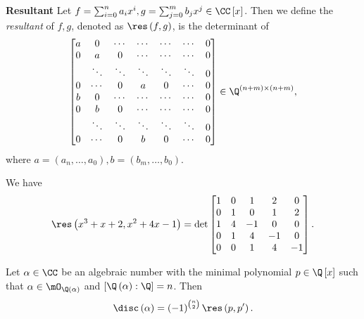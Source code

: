 \documentclass[pmath441]{subfiles}
\begin{document}
    \begin{definition}{\textbf{Resultant}}
        Let $f=\sum^{n}_{i=0}a_ix^i, g=\sum^{m}_{j=0}b_jx^j\in\CC\left[ x \right]$. Then we define the \emph{resultant} of $f,g$, denoted as $\res\left( f,g \right)$, is the determinant of
        \begin{equation*}
            \begin{bmatrix} 
                a & 0 & \cdots & \cdots & \cdots & \cdots & 0\\
                0 & a & 0 & \cdots & \cdots & \cdots & 0 \\
                  & \ddots & \ddots & \ddots & \ddots & \ddots & 0 \\
                0 & \cdots & 0 & a & 0 & \cdots & 0 \\
                b & 0 & \cdots & \cdots & \cdots & \cdots & 0  \\
                0 & b & 0 & \cdots & \cdots & \cdots & 0 \\
                  & \ddots & \ddots & \ddots & \ddots & \ddots & 0 \\
                0 & \cdots & 0 & b & 0 & \cdots & 0 \\
            \end{bmatrix} \in\Q^{\left( n+m \right)\times\left( n+m \right)} ,
        \end{equation*}
        where $a = \left( a_n,\ldots,a_0 \right), b = \left( b_m,\ldots,b_0 \right)$.
    \end{definition}

    \begin{example}{}
        We have
        \begin{equation*}
            \res\left( x^3+x+2,x^{2}+4x-1 \right) =
            \det
            \begin{bmatrix}
            	1 & 0 & 1 & 2 & 0 \\
            	0 & 1 & 0 & 1 & 2 \\
            	1 & 4 & -1 & 0 & 0 \\
            	0 & 1 & 4 & -1 & 0 \\
            	0 & 0 & 1 & 4 & -1 \\
            \end{bmatrix}.
        \end{equation*}
    \end{example}

    \rruleline
    
    \begin{fact}{}
        Let $\alpha\in\CC$ be an algebraic number with the minimal polynomial $p\in\Q\left[ x \right]$ such that $\alpha\in\mO_{\Q\left( \alpha \right)}$ and $\left[ \Q\left( \alpha \right):\Q \right]=n$. Then
        \begin{equation*}
            \disc\left( \alpha \right) = \left( -1 \right)^{\binom{n}{2}}\res\left( p,p' \right).
        \end{equation*}
    \end{fact}
\end{document}

